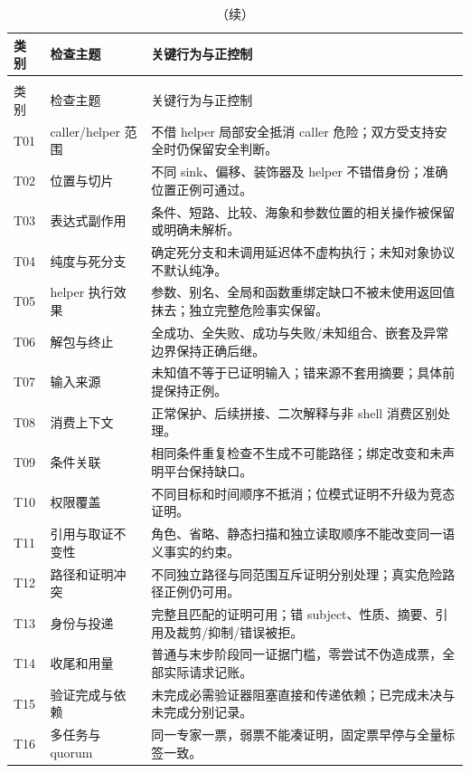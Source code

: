\begin{longtable}{L{13mm}L{46mm}L{90mm}}
\caption{测试契约要求的验收类别。当前主链核验不表示所有组合已穷尽。\citep{contract}}\label{tab:acceptance}\\
\toprule 类别 & 检查主题 & 关键行为与正控制\\\midrule\endfirsthead
\caption[]{（续）}\\
\toprule 类别 & 检查主题 & 关键行为与正控制\\\midrule\endhead
T01 & caller/helper 范围 & 不借 helper 局部安全抵消 caller 危险；双方受支持安全时仍保留安全判断。\\
T02 & 位置与切片 & 不同 sink、偏移、装饰器及 helper 不错借身份；准确位置正例可通过。\\
T03 & 表达式副作用 & 条件、短路、比较、海象和参数位置的相关操作被保留或明确未解析。\\
T04 & 纯度与死分支 & 确定死分支和未调用延迟体不虚构执行；未知对象协议不默认纯净。\\
T05 & helper 执行效果 & 参数、别名、全局和函数重绑定缺口不被未使用返回值抹去；独立完整危险事实保留。\\
T06 & 解包与终止 & 全成功、全失败、成功与失败/未知组合、嵌套及异常边界保持正确后继。\\
T07 & 输入来源 & 未知值不等于已证明输入；错来源不套用摘要；具体前提保持正例。\\
T08 & 消费上下文 & 正常保护、后续拼接、二次解释与非 shell 消费区别处理。\\
T09 & 条件关联 & 相同条件重复检查不生成不可能路径；绑定改变和未声明平台保持缺口。\\
T10 & 权限覆盖 & 不同目标和时间顺序不抵消；位模式证明不升级为竞态证明。\\
T11 & 引用与取证不变性 & 角色、省略、静态扫描和独立读取顺序不能改变同一语义事实的约束。\\
T12 & 路径和证明冲突 & 不同独立路径与同范围互斥证明分别处理；真实危险路径正例仍可用。\\
T13 & 身份与投递 & 完整且匹配的证明可用；错 subject、性质、摘要、引用及裁剪/抑制/错误被拒。\\
T14 & 收尾和用量 & 普通与末步阶段同一证据门槛，零尝试不伪造成票，全部实际请求记账。\\
T15 & 验证完成与依赖 & 未完成必需验证器阻塞直接和传递依赖；已完成未决与未完成分别记录。\\
T16 & 多任务与 quorum & 同一专家一票，弱票不能凑证明，固定票早停与全量标签一致。\\
\bottomrule
\end{longtable}
